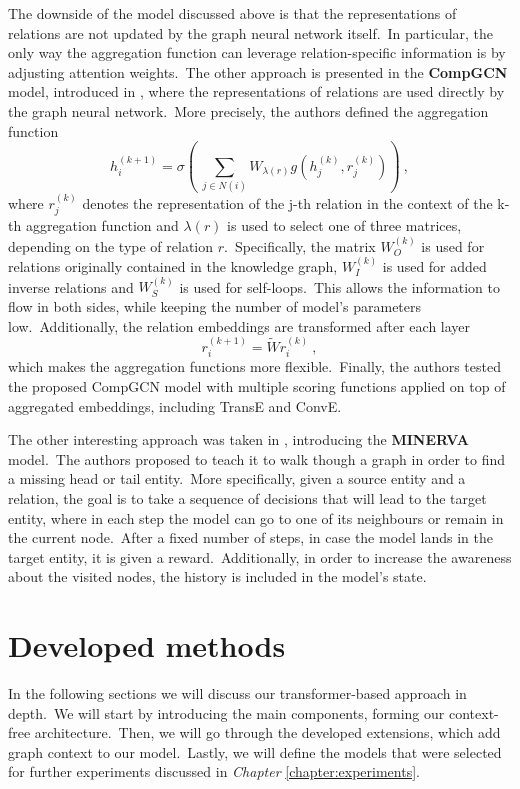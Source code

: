 \documentclass[longabstract, english, mgr]{iithesis}
\newcommand\numberedchapter[1]{\setlength\topskip{3cm}\chapter{#1}\setlength\topskip{0cm}}
\theoremstyle{default_theorem_style}\newtheorem{theorem}{Theorem}
\theoremstyle{default_theorem_style}\newtheorem{definition}{Definition}
\begin{document}
\noindent The downside of the model discussed above is that the representations of relations are not updated by the
graph neural network itself.\ In particular, the only way the aggregation function can leverage relation-specific
information is by adjusting attention weights.\ The other approach is presented in the \textbf{CompGCN} model,
introduced in \cite{comp_gcn_model}, where the representations of relations are used directly by the graph neural
network.\ More precisely, the authors defined the aggregation function
$$
h_i^{(k + 1)} = \sigma\left(\ \sum_{j \in N(i)} W_{\lambda(r)} g(h_j^{(k)}, r_j^{(k)})\right)\ ,
$$
where $r_j^{(k)}$ denotes the representation of the j-th relation in the context of the k-th aggregation function and
$\lambda(r)$ is used to select one of three matrices, depending on the type of relation $r$.\ Specifically, the
matrix $W_O^{(k)}$ is used for relations originally contained in the knowledge graph, $W_I^{(k)}$ is used for added
inverse relations and $W_S^{(k)}$ is used for self-loops.\ This allows the information to flow in both sides, while
keeping the number of model's parameters low.\ Additionally, the relation embeddings are transformed after each layer
$$
r_i^{(k + 1)} = \tilde{W} r_i^{(k)}\ ,
$$
which makes the aggregation functions more flexible.\ Finally, the authors tested the proposed CompGCN model with
multiple scoring functions applied on top of aggregated embeddings, including TransE and ConvE.\newline

\noindent The other interesting approach was taken in \cite{go_for_a_walk_model}, introducing the \textbf{MINERVA}
model.\ The authors proposed to teach it to walk though a graph in order to find a missing head or tail
entity.\ More specifically, given a source entity and a relation, the goal is to take a sequence of decisions that
will lead to the target entity, where in each step the model can go to one of its neighbours or remain in the current
node.\ After a fixed number of steps, in case the model lands in the target entity, it is given a reward.\ Additionally,
in order to increase the awareness about the visited nodes, the history is included in the model's state.


\numberedchapter{Developed methods}\label{chapter:developed_methods}

In the following sections we will discuss our transformer-based approach in depth.\ We will start by introducing the
main components, forming our context-free architecture.\ Then, we will go through the developed extensions, which
add graph context to our model.\ Lastly, we will define the models that were selected for further
experiments discussed in \textit{Chapter} \ref{chapter:experiments}.
\end{document}
